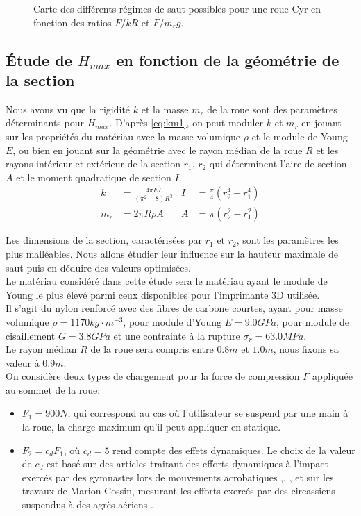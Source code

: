\begin{figure}[htb]
\def\svgwidth{400}

\caption{Carte des différents régimes de saut possibles pour une roue Cyr en fonction des ratios $F/kR$ et $F/m_r g$.}
\label{fig:regime}
\end{figure}

\subsection{Étude de $H_{max}$ en fonction de la géométrie de la section}
Nous avons vu que la rigidité $k$ et la masse $m_r$ de la roue sont des paramètres déterminants pour $H_{max}$. 
D'après \ref{eq:km1}, on peut moduler $k$ et $m_r$ en jouant sur les propriétés du matériau avec la masse volumique $\rho$ et le module de Young $E$, ou bien en jouant sur la géométrie avec le rayon médian de la roue $R$ et les rayons intérieur et extérieur de la section $r_1$, $r_2$ qui déterminent l'aire de section $A$ et le moment quadratique de section $I$.
\begin{align}
    k&=\frac{4\pi EI}{(\pi^2 -8)R^3} &  I&=\frac{\pi}{4}(r_2^4-r_1^4) \nonumber\\
    m_r&=2\pi R \rho A   & A&=\pi (r_2^2-r_1^2)
    \label{eq:km1}
\end{align}

Les dimensions de la section, caractérisées par $r_1$ et $r_2$, sont les paramètres les plus malléables. Nous allons étudier leur influence sur la hauteur maximale de saut puis en déduire des valeurs optimisées. \\
Le matériau considéré dans cette étude sera le matériau ayant le module de Young le plus élevé parmi ceux disponibles pour l'imprimante 3D utilisée.\\
Il s'agit du nylon renforcé avec des fibres de carbone courtes, ayant pour masse volumique $\rho=1170 kg \cdot m^{-3}$, pour module d'Young $E=9.0 GPa$, pour module de cisaillement $G=3.8 GPa$ et une contrainte à la rupture $\sigma_r=63.0 MPa$.\\
Le rayon médian $R$ de la roue sera compris entre $0.8 m$ et $1.0 m$, nous fixons sa valeur à $0.9 m$. \\
On considère deux types de chargement pour la force de compression $F$ appliquée au sommet de la roue: 
\begin{itemize}
    \item $F_1=900 N$, qui correspond au cas où l'utilisateur se suspend par une main à la roue, la charge maximum qu'il peut appliquer en statique. 
    \item $F_2=c_d F_1 $, où $c_d=5$ rend compte des effets dynamiques. Le choix de la valeur de $c_d$ est basé sur des articles traitant des efforts dynamiques à l'impact exercés par des gymnastes lors de mouvements acrobatiques \cite{marinsek},\cite{seegmiller_ground_nodate}, \cite{mcnair_normative_1999},\cite{prapavessis_effects_1999} et sur les travaux de Marion Cossin, mesurant les efforts exercés par des circassiens suspendus à des agrès aériens \cite{cossin_mesure_nodate}.
\end{itemize}
 

